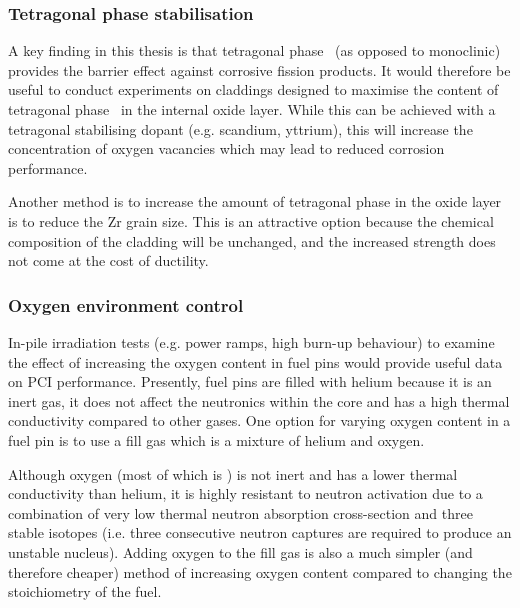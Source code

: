 \subsubsection{Tetragonal phase stabilisation}

A key finding in this thesis is that tetragonal phase \zirconia\ (as opposed to monoclinic) provides the barrier effect against corrosive fission products. It would therefore be useful to conduct experiments on claddings designed to maximise the content of tetragonal phase \zirconia\ in the internal oxide layer. While this can be achieved with a tetragonal stabilising dopant (e.g. scandium, yttrium), this will increase the concentration of oxygen vacancies which may lead to reduced corrosion performance. 

Another method is to increase the amount of tetragonal phase in the oxide layer is to reduce the Zr grain size. This is an attractive option because the chemical composition of the cladding will be unchanged, and the increased strength does not come at the cost of ductility. 

\subsubsection{Oxygen environment control}

In-pile irradiation tests (e.g. power ramps, high burn-up behaviour) to examine the effect of increasing the oxygen content in fuel pins would provide useful data on PCI performance. Presently, fuel pins are filled with helium because it is an inert gas, it does not affect the neutronics within the core and has a high thermal conductivity compared to other gases. One option for varying oxygen content in a fuel pin is to use a fill gas which is a mixture of helium and oxygen. 

Although oxygen (most of which is ) is not inert and has a lower thermal conductivity than helium, it is highly resistant to neutron activation due to a combination of very low thermal neutron absorption cross-section and three stable isotopes (i.e. three consecutive neutron captures are required to produce an unstable  nucleus). Adding oxygen to the fill gas is also a much simpler (and therefore cheaper) method of increasing oxygen content compared to changing the stoichiometry of the fuel.

